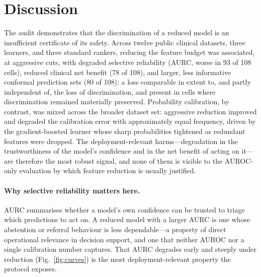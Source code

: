 \documentclass[fleqn,10pt]{wlscirep}
\begin{document}
\begin{table}[t]
\centering
\caption{Raw versus leakage-safe Platt- and isotonic-recalibrated reduction penalty at 25\,\% of
features (mean paired difference vs.\ full over the twelve datasets, the mutual-information ranker, and
three learners; positive ECE/Brier/AURC values indicate degradation, as do negative AUROC/net-benefit
values), with
the count of materially worse cells. Recalibration recovers the (learner-specific) calibration-error
penalty but not the AURC, Brier, or net-benefit loss, and isotonic does no better than Platt.
Computed from the released recalibration-control summary.}
\label{tab:recal}

\end{table}

\section{Discussion}
\label{sec:discussion}

The audit demonstrates that the discrimination of a reduced model is an insufficient certificate of its
safety. Across twelve public clinical datasets, three learners,
and three standard rankers, reducing the feature budget was associated, at aggressive cuts, with
degraded selective reliability (AURC, worse in 93 of 108 cells), reduced clinical net benefit (78 of
108), and larger, less informative conformal prediction sets (80 of 108): a loss comparable in extent
to, and partly independent of, the loss of discrimination, and present in cells where discrimination
remained materially preserved. Probability calibration, by contrast, was mixed across the broader
dataset set: aggressive reduction improved and degraded the calibration error with approximately equal
frequency, driven by the gradient-boosted learner whose sharp probabilities tightened as redundant
features were dropped. The deployment-relevant harms---degradation in the trustworthiness of the
model's confidence and in the net benefit of acting on it---are therefore the most robust signal, and
none of them is visible to the AUROC-only evaluation by which feature reduction is usually justified.

\paragraph{Why selective reliability matters here.} AURC summarises whether a model's own
confidence can be trusted to triage which predictions to act on. A reduced model with a larger
AURC is one whose abstention or referral behaviour is less dependable---a property of direct
operational relevance in decision support, and one that neither AUROC nor a single calibration
number captures. That AURC degrades early and steeply under reduction (Fig.~\ref{fig:curves}) is the
most deployment-relevant property the protocol exposes.
\end{document}
